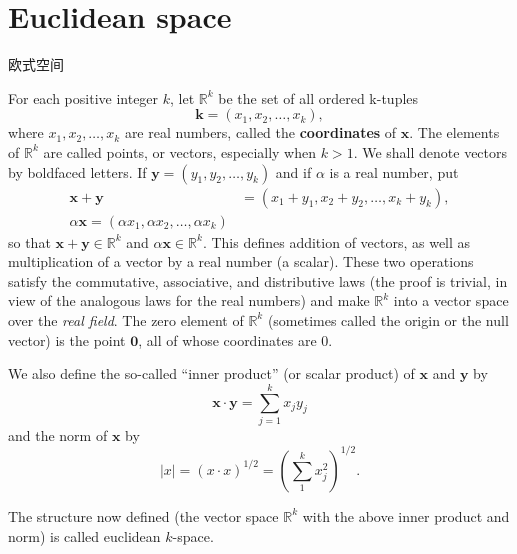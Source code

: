 \section{Euclidean space}
欧式空间

\begin{myDefinition}\label{myDefinition:coordinates1.36}
    For each positive integer $k$, let $\mathbb{R}^k$ be the set of all ordered k-tuples
    \begin{equation*}
        \mathbf{k} = \left(x_1,x_2,\dots,x_k\right),
    \end{equation*}
    where $x_1,x_2,\dots,x_k$ are real numbers, called the \textbf{coordinates} of $\mathbf{x}$. The elements of
    $\mathbb{R}^k$ are called points, or vectors, especially when $k > 1$. We shall denote vectors
    by boldfaced letters. 
    If $\mathbf{y} = \left(y_1,y_2,\dots,y_k\right)$ and if $\alpha$ is a real number, put
    \begin{align*}
        \mathbf{x} + \mathbf{y} &= \left(x_1+y_1,x_2+y_2,\dots,x_k+y_k\right),\\
        \alpha\mathbf{x}  = \left(\alpha x_1,\alpha x_2,\dots,\alpha x_k\right)
    \end{align*}
    so that $\mathbf{x} +\mathbf{y} \in \mathbb{R}^k$ and $\alpha\mathbf{x} \in \mathbb{R}^k$. This defines addition of vectors, as well as multiplication of a vector by a real number (a scalar). These two operations satisfy the commutative, associative, and distributive laws (the proof is trivial, in view of the analogous laws for the real numbers) and make $\mathbb{R}^k$ into a vector space over the \emph{real field}. The zero element of $\mathbb{R}^k$ (sometimes called the origin or the null vector) is the point $\mathbf{0}$, all of whose coordinates are $0$.

    We also define the so-called ``inner product'' (or scalar product) of $\mathbf{x}$ and $\mathbf{y}$ by
    \begin{equation*}
        \mathbf{x}\cdot\mathbf{y} = \sum_{j=1}^{k}x_j y_j
    \end{equation*}
    and the norm of $\mathbf{x}$ by
    \begin{equation*}
        |x| = (x\cdot x)^{1/2} = \left( \sum_{1}^{k} x_j^2 \right)^{1/2}.
    \end{equation*}

    The structure now defined (the vector space $\mathbb{R}^k$ with the above inner product and norm) is called euclidean $k$-space.
\end{myDefinition}

